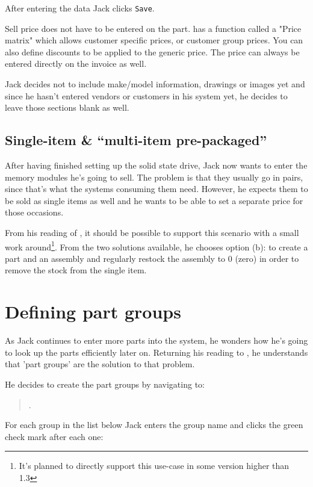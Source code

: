 After entering the data Jack clicks \texttt{Save}.

Sell price does not have to be entered on the part. 
\lsmbsp has a function called a "Price matrix" which allows customer specific prices, or customer group prices.
You can also define discounts to be applied to the generic price. 
The price can always be entered directly on the invoice as well.

Jack decides not to include make/model information, drawings or images yet and since
he hasn't entered vendors or customers in his system yet, he decides to leave
those sections blank as well.

\subsection{Single-item \& ``multi-item pre-packaged''}
\label{subsec-stock-parts-mulit-item}

After having finished setting up the solid state drive, Jack now wants to enter
the memory modules he's going to sell. The problem is that they usually go in pairs,
since that's what the systems consuming them need. However, he expects them to be sold
as single items as well and he wants to be able to set a separate price for those occasions.

From his reading of , it should be
possible to support this scenario with a small work around\footnote{It's planned to directly
support this use-case in some version higher than 1.3}. From the two solutions available,
he chooses option (b): to create a part and an assembly and regularly restock the assembly
to 0 (zero) in order to remove the stock from the single item.

\section{Defining part groups}
\label{sec-stock-part-groups}

As Jack continues to enter more parts into the system, he wonders how he's going to
look up the parts efficiently later on. Returning his reading to ,
he understands that 'part groups'  are the solution to that problem. 

He decides to create
the part groups by navigating to:
\begin{quote}
.
\end{quote}
For each group in the list below Jack enters the group name and clicks the green check mark after each one:

